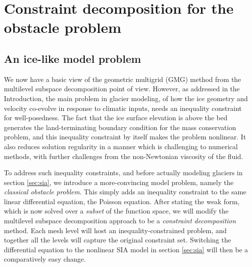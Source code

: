 \documentclass[letterpaper,final,12pt,reqno]{amsart}
\theoremstyle{claim}
\numberwithin{equation}{section}
\numberwithin{figure}{section}
\numberwithin{table}{section}
\begin{document}
\section{Constraint decomposition for the obstacle problem} \label{sec:obstacle}

\subsection*{An ice-like model problem}  We now have a basic view of the geometric multigrid (GMG) method from the multilevel subspace decomposition point of view.  However, as addressed in the Introduction, the main problem in glacier modeling, of how the ice geometry and velocity co-evolve in response to climatic inputs, needs an inequality constraint for well-posedness.  The fact that the ice surface elevation is above the bed generates the land-terminating boundary condition for the mass conservation problem, and this inequality constraint by itself makes the problem nonlinear.  It also reduces solution regularity in a manner which is challenging to numerical methods, with further challenges from the non-Newtonian viscosity of the fluid.

To address such inequality constraints, and before actually modeling glaciers in section \ref{sec:sia}, we introduce a more-convincing model problem, namely the \emph{classical obstacle problem}.  This simply adds an inequality constraint to the same linear differential equation, the Poisson equation.  After stating the weak form, which is now solved over a \emph{subset} of the function space, we will modify the multilevel subspace decomposition approach to be a \emph{constraint decomposition} method.  Each mesh level will host an inequality-constrained problem, and together all the levels will capture the original constraint set.  Switching the differential equation to the nonlinear SIA model in section \ref{sec:sia} will then be a comparatively easy change.
\end{document}
